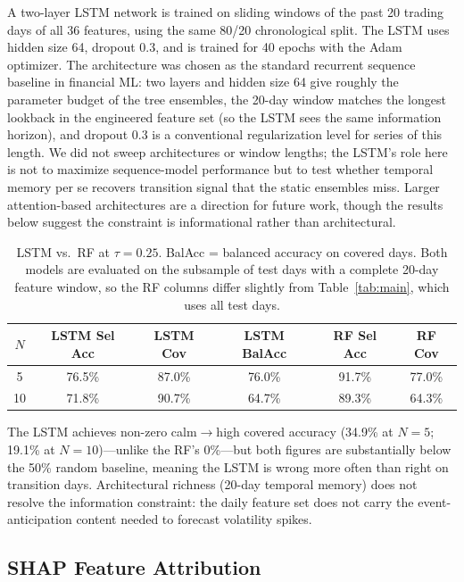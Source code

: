 \documentclass[12pt]{article}
\begin{document}
A two-layer LSTM network is trained on sliding windows of the past 20 trading days of all 36
features, using the same 80/20 chronological split. The LSTM uses hidden size 64, dropout 0.3,
and is trained for 40 epochs with the Adam optimizer. The architecture was chosen as the
standard recurrent sequence baseline in financial ML: two layers and hidden size 64 give
roughly the parameter budget of the tree ensembles, the 20-day window matches the longest
lookback in the engineered feature set (so the LSTM sees the same information horizon), and
dropout 0.3 is a conventional regularization level for series of this length. We did not sweep
architectures or window lengths; the LSTM's role here is not to maximize sequence-model
performance but to test whether temporal memory per se recovers transition signal that the
static ensembles miss. Larger attention-based architectures are a direction for future work,
though the results below suggest the constraint is informational rather than architectural.

\begin{table}[H]
\centering
\caption{LSTM vs.\ RF at $\tau = 0.25$. BalAcc = balanced accuracy on covered days.
Both models are evaluated on the subsample of test days with a complete 20-day feature
window, so the RF columns differ slightly from Table~\ref{tab:main}, which uses all test
days.}
\label{tab:lstm}
\begin{tabular}{cccccc}
\toprule
$N$ & LSTM Sel Acc & LSTM Cov & LSTM BalAcc & RF Sel Acc & RF Cov \\
\midrule
5  & 76.5\% & 87.0\% & 76.0\% & 91.7\% & 77.0\% \\
10 & 71.8\% & 90.7\% & 64.7\% & 89.3\% & 64.3\% \\
\bottomrule
\end{tabular}
\end{table}

The LSTM achieves non-zero calm$\to$high covered accuracy (34.9\% at $N = 5$; 19.1\% at
$N = 10$)---unlike the RF's 0\%---but both figures are substantially below the 50\% random
baseline, meaning the LSTM is wrong more often than right on transition days. Architectural
richness (20-day temporal memory) does not resolve the information constraint: the daily feature
set does not carry the event-anticipation content needed to forecast volatility spikes.

\subsection{SHAP Feature Attribution}
\label{sec:shap}
\end{document}
